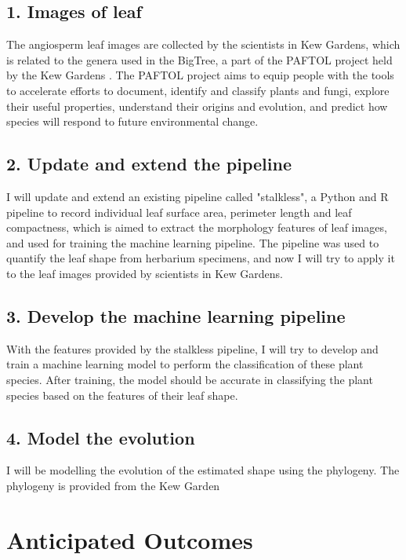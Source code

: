 \documentclass[11pt]{article}
\begin{document}
\subsection*{1. Images of leaf}
\linenumbers
The angiosperm leaf images are collected by the scientists in Kew Gardens, which is related to the genera used in the BigTree, a part of the PAFTOL project held by the Kew Gardens \cite{baker2021comprehensive}. The PAFTOL project aims to equip people with the tools to accelerate efforts to document, identify and classify plants and fungi, explore their useful properties, understand their origins and evolution, and predict how species will respond to future environmental change.

\nolinenumbers
\subsection*{2. Update and extend the pipeline}
\linenumbers

I will update and extend an existing pipeline called "stalkless", a Python and R pipeline to record individual leaf surface area, perimeter length and leaf compactness, which is aimed to extract the morphology features of leaf images, and used for training the machine learning pipeline. The pipeline was used to quantify the leaf shape from herbarium specimens, and now I will try to apply it to the leaf images provided by scientists in Kew Gardens.

\nolinenumbers
\subsection*{3. Develop the machine learning pipeline}
\linenumbers

With the features provided by the stalkless pipeline, I will try to develop and train a machine learning model to perform the classification of these plant species. After training, the model should be accurate in classifying the plant species based on the features of their leaf shape.

\nolinenumbers
\subsection*{4. Model the evolution}
\linenumbers

I will be modelling the evolution of the estimated shape using the phylogeny. The phylogeny is provided from the Kew Garden

\nolinenumbers
\section*{Anticipated Outcomes}
\linenumbers
\end{document}

